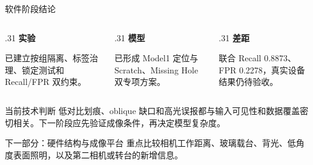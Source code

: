 \documentclass[aspectratio=169,10pt]{beamer}
\begin{document}
\begin{frame}{软件阶段结论}
  \begin{columns}[T,onlytextwidth]
    \begin{column}{.31\textwidth}
      \centering
      {\color{seugreen}\Large\bfseries 实验}

      \vspace{.5em}
      已建立按组隔离、标签治理、锁定测试和 Recall/FPR 双约束。
    \end{column}
    \begin{column}{.31\textwidth}
      \centering
      {\color{seugreen}\Large\bfseries 模型}

      \vspace{.5em}
      已形成 Model1 定位与 Scratch、Missing Hole 双专项方案。
    \end{column}
    \begin{column}{.31\textwidth}
      \centering
      {\color{seugreen}\Large\bfseries 差距}

      \vspace{.5em}
      联合 Recall 0.8873、FPR 0.2278，真实设备结果仍待验收。
    \end{column}
  \end{columns}

  \vspace{1.1em}
  \begin{block}{当前技术判断}
    低对比划痕、oblique 缺口和高光误报都与输入可见性和数据覆盖密切相关。下一阶段应先验证成像条件，再决定模型复杂度。
  \end{block}

  \vfill
  \begin{exampleblock}{下一部分：硬件结构与成像平台}
    重点比较相机工作距离、玻璃载台、背光、低角度表面照明，以及第二相机或转台的新增信息。
  \end{exampleblock}
\end{frame}
\end{document}
